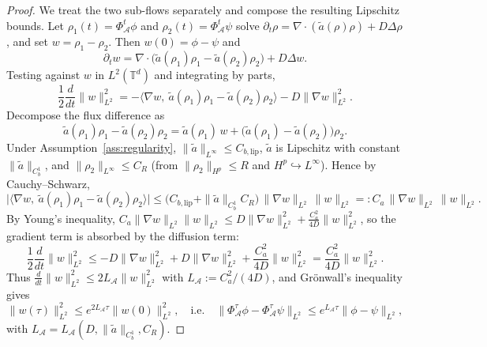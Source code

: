 \documentclass[12pt]{article}
\begin{document}
\begin{proof}
We treat the two sub-flows separately and compose the resulting Lipschitz
bounds.
Let $\rho_1(t)=\Phi^{t}_{\mathcal A}\phi$ and $\rho_2(t)=\Phi^{t}_{\mathcal A}\psi$ solve
$\partial_t\rho=\nabla\!\cdot(\tilde a(\rho)\rho)+D\Delta\rho$, and set
$w=\rho_1-\rho_2$. Then $w(0)=\phi-\psi$ and
\[
\partial_t w
=\nabla\!\cdot\!\big(\tilde a(\rho_1)\rho_1-\tilde a(\rho_2)\rho_2\big)
+D\Delta w .
\]
Testing against $w$ in $L^{2}(\mathbb T^{d})$ and integrating by parts,
\[
\frac12\frac{d}{dt}\|w\|_{L^{2}}^{2}
=-\big\langle \nabla w,\ \tilde a(\rho_1)\rho_1-\tilde a(\rho_2)\rho_2\big\rangle
-D\|\nabla w\|_{L^{2}}^{2}.
\]
Decompose the flux difference as
\[
\tilde a(\rho_1)\rho_1-\tilde a(\rho_2)\rho_2
=\tilde a(\rho_1)\,w+\big(\tilde a(\rho_1)-\tilde a(\rho_2)\big)\rho_2 .
\]
Under Assumption~\ref{ass:regularity}, $\|\tilde a\|_{L^\infty}\le C_{b,\mathrm{lip}}$,
$\tilde a$ is Lipschitz with constant $\|\tilde a\|_{C^{1}_b}$, and
 $\|\rho_2\|_{L^\infty}\le C_R$ (from $\|\rho_2\|_{H^{p}}\le R$ and
$H^{p}\hookrightarrow L^\infty$). Hence by Cauchy--Schwarz,
\[
\big|\big\langle \nabla w,\ \tilde a(\rho_1)\rho_1-\tilde a(\rho_2)\rho_2\big\rangle\big|
\le \big(C_{b,\mathrm{lip}}+\|\tilde a\|_{C^{1}_b}C_R\big)\,
\|\nabla w\|_{L^{2}}\,\|w\|_{L^{2}}
=: C_a\,\|\nabla w\|_{L^{2}}\,\|w\|_{L^{2}} .
\]
By Young's inequality, $C_a\|\nabla w\|_{L^2}\|w\|_{L^2}
\le D\|\nabla w\|_{L^2}^2+\tfrac{C_a^2}{4D}\|w\|_{L^2}^2$, so the gradient term is
absorbed by the diffusion term:
\[
\frac12\frac{d}{dt}\|w\|_{L^{2}}^{2}
\le -D\|\nabla w\|_{L^{2}}^{2}+D\|\nabla w\|_{L^{2}}^{2}
+\frac{C_a^{2}}{4D}\|w\|_{L^{2}}^{2}
=\frac{C_a^{2}}{4D}\|w\|_{L^{2}}^{2}.
\]
Thus $\frac{d}{dt}\|w\|_{L^2}^2\le 2L_{\mathcal A}\|w\|_{L^2}^2$ with
$L_{\mathcal A}:=C_a^{2}/(4D)$, and Gr\"onwall's inequality gives
\[
\|w(\tau)\|_{L^{2}}^{2}\le e^{2L_{\mathcal A}\tau}\|w(0)\|_{L^{2}}^{2},
\quad\text{i.e.}\quad
\big\|\Phi^{\tau}_{\mathcal A}\phi-\Phi^{\tau}_{\mathcal A}\psi\big\|_{L^{2}}
\le e^{L_{\mathcal A}\tau}\|\phi-\psi\|_{L^{2}},
\]
with $L_{\mathcal A}=L_{\mathcal A}(D,\|\tilde a\|_{C^{1}_b},C_R)$.


\end{proof}
\end{document}
